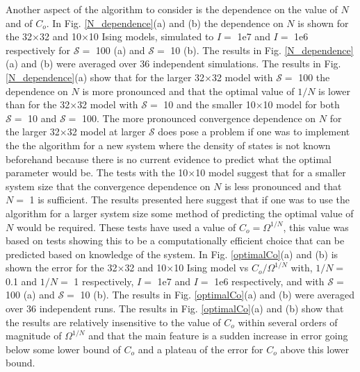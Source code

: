 \documentclass[aps,pre,reprint,superscriptaddress,showkeys]{revtex4-1}
\begin{document}
Another aspect of the algorithm to consider is the dependence on the value of $N$ and of $C_{o}$. In Fig. \ref{N_dependence}(a) and (b) the dependence on $N$ is shown for  the 32$\times$32  and  10$\times$10 Ising models, simulated to $I=$ 1e7 and $I=$ 1e6 respectively for $\mathcal{S}=$ 100  (a) and $\mathcal{S}=$ 10  (b). The results in Fig. \ref{N_dependence}(a) and (b) were averaged over 36 independent simulations. The results in Fig. \ref{N_dependence}(a) show that for the larger 32$\times$32 model with $\mathcal{S}=$ 100 the dependence on $N$ is more pronounced and that the optimal value of $1/N$ is lower than for the  32$\times$32 model with $\mathcal{S}=$ 10 and the  smaller 10$\times$10 model for both $\mathcal{S}=$ 10 and $\mathcal{S}=$ 100. The more pronounced convergence dependence on $N$ for the larger 32$\times$32 model at larger $\mathcal{S}$ does pose a problem if one was to implement the the algorithm for a new system where the density of states is not known beforehand because there is no current evidence to predict what the optimal parameter would be.  The tests with the 10$\times$10 model suggest that for a smaller system size that the convergence dependence on $N$ is less pronounced and that $N=$ 1 is sufficient. The results presented here suggest that if one was to use the algorithm for a larger system size some method of predicting the optimal value of $N$ would be required. These tests have used a value of $C_{o}=\Omega^{1/N}$, this value was based on tests showing this to be a computationally efficient choice that can be predicted based on knowledge of the system. In Fig. \ref{optimalCo}(a) and (b)  is shown the error for the 32$\times$32 and 10$\times$10   Ising model vs $C_{o}/\Omega^{1/N}$ with, $1/N=$ 0.1 and $1/N=$ 1 respectively, $I=$ 1e7 and $I=$ 1e6 respectively, and with $\mathcal{S}=$ 100  (a) and $\mathcal{S}=$ 10  (b). The results in Fig. \ref{optimalCo}(a) and (b) were averaged over 36 independent runs. The results in Fig. \ref{optimalCo}(a) and (b)  show that the results are relatively insensitive to the value of $C_{o}$ within several orders of magnitude of $\Omega^{1/N}$ and that the main feature is a sudden increase in error going below some lower bound of $C_{o}$ and a plateau of the error for $C_{o}$ above this lower bound. 
\end{document}
